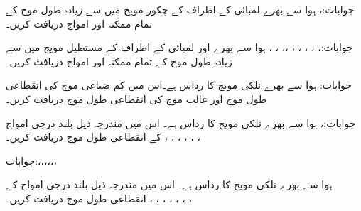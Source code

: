 جوابات:،  
ہوا سے بھرے  لمبائی کے اطراف کے چکور مویج میں  سے زیادہ طول موج کے تمام ممکنہ  اور  امواج دریافت کریں۔

جوابات:، ، ، ، ، ،، ، ،
ہوا سے بھرے  اور  لمبائی کے اطراف کے  مستطیل مویج میں  سے زیادہ طول موج کے تمام ممکنہ  اور  امواج دریافت کریں۔

جوابات:
ہوا سے بھرے نلکی مویج کا رداس  ہے۔اس میں کم ضیاعی  موج کی انقطاعی طول موج اور غالب  موج کی انقطاعی طول موج دریافت کریں۔

جوابات:، 
ہوا سے بھرے نلکی مویج کا رداس  ہے۔ اس میں مندرجہ ذیل بلند درجی امواج کے انقطاعی طول موج دریافت کریں۔ ، ، ، ، ،  ، 

جوابات:،،،،،،

ہوا سے بھرے نلکی مویج کا رداس  ہے۔ اس میں مندرجہ ذیل بلند درجی امواج کے انقطاعی طول موج دریافت کریں۔ ، ، ، ، ، ، ، 

